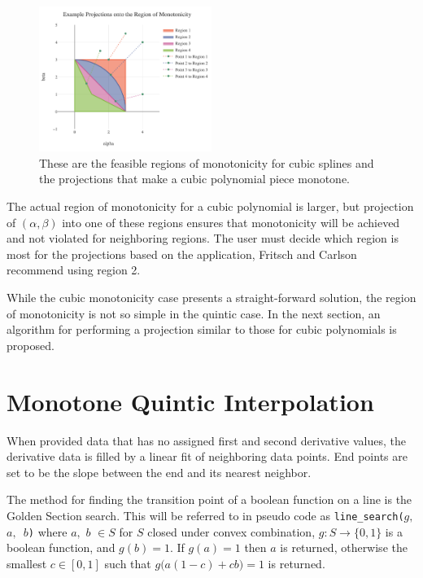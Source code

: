 \documentclass{scspaperproc}
\theoremstyle{scsthe}
\begin{document}
\begin{figure}
  \centering
  \includegraphics[width=0.50\textwidth]{demo_projection}
  \caption{These are the feasible regions of monotonicity for cubic splines and the projections that make a cubic polynomial piece monotone.}\label{fig:projection}
\end{figure}

The actual region of monotonicity for a cubic polynomial is larger, but projection of $(\alpha, \beta)$ into one of these regions ensures that monotonicity will be achieved and not violated for neighboring regions. The user must decide which region is most for the projections based on the application, Fritsch and Carlson recommend using region 2.

While the cubic monotonicity case presents a straight-forward solution, the region of monotonicity is not so simple in the quintic case. In the next section, an algorithm for performing a projection similar to those for cubic polynomials is proposed.





\section{Monotone Quintic Interpolation}

When provided data that has no assigned first and second derivative values, the derivative data is filled by a linear fit of neighboring data points. End points are set to be the slope between the end and its nearest neighbor.

The method for finding the transition point of a boolean function on a line is the Golden Section search. This will be referred to in pseudo code as \texttt{line\_search($g,$ $a,$ $b$)} where $a,$ $b$ $\in S$ for $S$ closed under convex combination, $g: S \rightarrow \{0,1\}$ is a boolean function, and $g(b) = 1$. If $g(a) = 1$ then $a$ is returned, otherwise the smallest $c \in [0,1]$ such that $g\big(a(1-c) + c b\big) = 1$ is returned.
\end{document}
